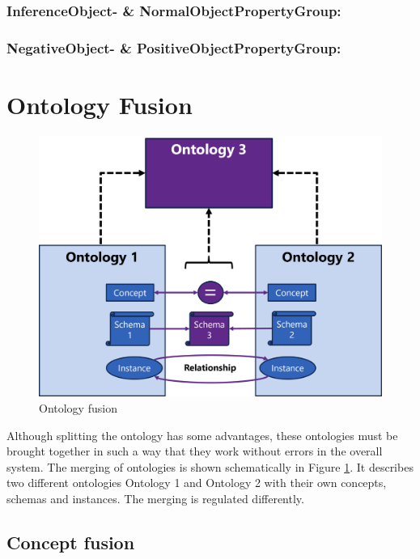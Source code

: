 \documentclass[
  a4paper,  %
  twoside,  %
  bibliography=totoc,
  headsepline,
  cleardoublepage=empty,
  parskip=half,
  draft=false
]{scrbook}
\begin{document}
\subsubsection{InferenceObject- \& NormalObjectPropertyGroup:}

\subsubsection{NegativeObject- \& PositiveObjectPropertyGroup:}



\section{Ontology Fusion}

\begin{figure}
  \centering
  \includegraphics[width=\textwidth]{graphics/ontologyFusion.png}
  \caption{Ontology fusion}
  \label{fig:fusion}
\end{figure}

Although splitting the ontology has some advantages, these ontologies must be brought together in such a way that they work without errors in the overall system. The merging of ontologies is shown schematically in Figure \ref{fig:fusion}. It describes two different ontologies Ontology 1 and Ontology 2 with their own concepts, schemas and instances. The merging is regulated differently. \\

\subsection{Concept fusion}\label{sec:concept_fusion}
\end{document}
